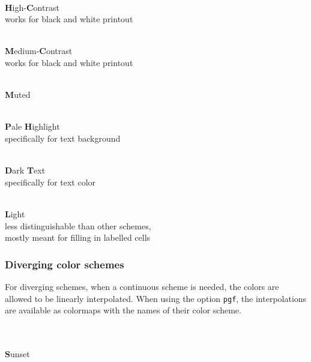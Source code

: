 \documentclass{scrartcl}
\begin{document}
\begin{minipage}{0.5\textwidth}
	\centering
	\\
	\textbf{H}igh-\textbf{C}ontrast\\
	works for black and white printout
\end{minipage}\hfill%
\begin{minipage}{0.5\textwidth}
	\centering
	\\
	\textbf{M}edium-\textbf{C}ontrast\\
	works for black and white printout
\end{minipage}

\begin{center}
	\\
	\textbf{M}uted
\end{center}

\begin{minipage}{0.5\textwidth}
	\centering
	\\
	\textbf{P}ale \textbf{H}ighlight\\
	specifically for text background
\end{minipage}\hfill%
\begin{minipage}{0.5\textwidth}
	\centering
	\\
	\textbf{D}ark \textbf{T}ext\\
	specifically for text color
\end{minipage}

\begin{center}
	\\
	\textbf{L}ight\\
	less distinguishable than other schemes,\\ mostly meant for filling in labelled cells
\end{center}\clearpage

\subsubsection{Diverging color schemes}\label{sec:T-D}
For diverging schemes, when a continuous scheme is needed, the colors are allowed to be linearly interpolated.
When using the option \texttt{pgf}, the interpolations are available as colormaps with the names of their color scheme.

\begin{center}
	\\
	\\
	\textbf{S}unset
\end{center}
\end{document}
